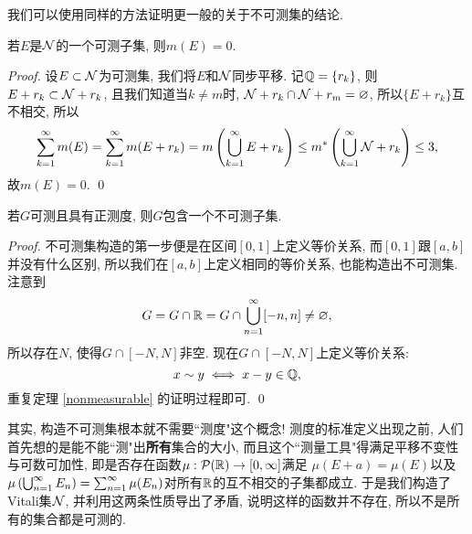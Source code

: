 我们可以使用同样的方法证明更一般的关于不可测集的结论.
\begin{exercise} %
    若$E$是$\mathcal{N}$的一个可测子集, 则$m(E) = 0$. 
\end{exercise}
\begin{proof}
    设$E \subset \mathcal{N}$为可测集, 我们将$E$和$\mathcal{N}$同步平移. 记$\mathbb{Q} = \{r_k\}$, 则$E + r_k \subset \mathcal{N} + r_k$, 且我们知道当$k \neq m$时, $\mathcal{N} + r_k \cap \mathcal{N} + r_m = \varnothing$, 所以$\{E + r_k\}$互不相交, 所以
    $$\sum_{k=1}^{\infty}m(E) = \sum_{k=1}^{\infty}m(E + r_k) 
    = m\left(\bigcup_{k=1}^{\infty}E+r_k\right) \leq m^*\left(\bigcup_{k=1}^{\infty}\mathcal{N}+r_k\right) \leq 3, $$
    故$m(E) = 0$. \qed 
\end{proof}
\begin{exercise} %
    若$G$可测且具有正测度, 则$G$包含一个不可测子集. 
\end{exercise}
\begin{proof}
    不可测集构造的第一步便是在区间$[0,1]$上定义等价关系, 而$[0,1]$跟$[a,b]$并没有什么区别, 所以我们在$[a,b]$上定义相同的等价关系, 也能构造出不可测集. 注意到
    $$G = G \cap \mathbb{R} = G \cap \bigcup_{n=1}^{\infty}[-n, n] \neq \varnothing,$$ 所以存在$N$, 使得$G \cap [-N, N]$非空. 现在$G \cap [-N, N]$上定义等价关系:
    $$x \sim y \iff x-y \in \mathbb{Q}, $$
    重复定理 \ref{nonmeasurable} 的证明过程即可. \qed 
\end{proof}

其实, 构造不可测集根本就不需要``测度"这个概念! 测度的标准定义出现之前, 人们首先想的是能不能``测"出\textbf{所有}集合的大小, 而且这个``测量工具"得满足平移不变性与可数可加性, 即是否存在函数$\mu: \mathcal{P}(\mathbb{R}) \to [0,\infty]$满足
$\mu(E+a) = \mu(E)$以及$\mu\left(\bigcup_{n=1}^{\infty}E_n\right) = \sum_{n=1}^{\infty}\mu(E_n)$对所有$\mathbb{R}$的互不相交的子集都成立. 于是我们构造了Vitali集$\mathcal{N}$, 并利用这两条性质导出了矛盾, 说明这样的函数并不存在, 所以不是所有的集合都是可测的. 